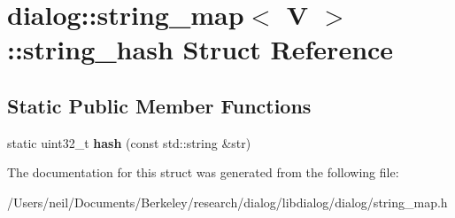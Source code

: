 \hypertarget{structdialog_1_1string__map_1_1string__hash}{}\section{dialog\+:\+:string\+\_\+map$<$ V $>$\+:\+:string\+\_\+hash Struct Reference}
\label{structdialog_1_1string__map_1_1string__hash}
\subsection*{Static Public Member Functions}
\begin{DoxyCompactItemize}
\item 
\mbox{\label{structdialog_1_1string__map_1_1string__hash_af3d2b4b69c436b0574ea6bc61952391a}} 
static uint32\+\_\+t {\bfseries hash} (const std\+::string \&str)
\end{DoxyCompactItemize}


The documentation for this struct was generated from the following file\+:\begin{DoxyCompactItemize}
\item 
/\+Users/neil/\+Documents/\+Berkeley/research/dialog/libdialog/dialog/string\+\_\+map.\+h\end{DoxyCompactItemize}
